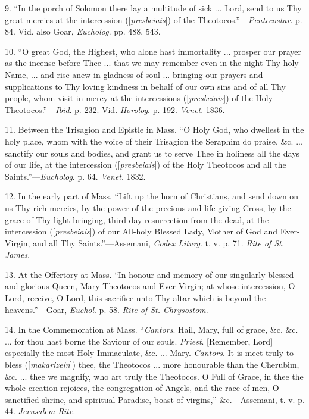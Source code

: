 9. ``In the porch of Solomon there lay a multitude of sick ...
Lord, send to us Thy great mercies at the intercession ([\emph{presbeiais}])
of the Theotocos.''—\emph{Pentecostar}. p. 84. Vid. also Goar, \emph{Eucholog}.
pp. 488, 543.


10. ``O great God, the Highest, who alone hast immortality ...
prosper our prayer as the incense before Thee ... that we may remember
even in the night Thy holy Name, ... and rise anew in gladness of soul
... bringing our prayers and supplications to Thy loving kindness in
behalf of our own sins and of all Thy people, whom visit in mercy at the
intercessions ([\emph{presbeiais}]) of the Holy Theotocos.''—\emph{Ibid}.
p. 232. Vid. \emph{Horolog}. p. 192. \emph{Venet}. 1836.


11. Between the Trisagion and Epistle in Mass. ``O Holy God, who
dwellest in the holy place, whom with the voice of their Trisagion the
Seraphim do praise, \&c. ... sanctify our souls and bodies, and grant
us to serve Thee in holiness all the days of our life, at the
intercession ([\emph{presbeiais}]) of the Holy Theotocos and all the
Saints.''—\emph{Eucholog}. p. 64. \emph{Venet}. 1832.


12. In the early part of Mass. ``Lift up the horn of Christians,
and send down on us Thy rich mercies, by the power of the precious and
life-giving Cross, by the grace of Thy light-bringing, third-day
resurrection from the dead, at the intercession ([\emph{presbeiais}]) of
our All-holy Blessed Lady, Mother of God and Ever-Virgin, and all Thy
Saints.''—Assemani, \emph{Codex Liturg}. t. v. p. 71. \emph{Rite of
St. James}.


13. At the Offertory at Mass. ``In honour and memory of our
singularly blessed and glorious Queen, Mary Theotocos and Ever-Virgin;
at whose intercession, O Lord, receive, O Lord, this sacrifice unto Thy
altar which is beyond the heavens.''—Goar, \emph{Euchol}. p. 58. \emph{Rite
of St. Chrysostom}.


14. In the Commemoration at Mass. ``\emph{Cantors}. Hail, Mary,
full of grace, \&c. \&c. ... for thou hast borne the Saviour of
our souls. \emph{Priest}. [Remember, Lord] especially the most Holy
Immaculate, \&c. ... Mary. \emph{Cantors}. It is meet truly to bless
([\emph{makarizein}]) thee, the Theotocos ... more honourable than the
Cherubim, \&c. ... thee we magnify, who art truly the Theotocos. O
Full of Grace, in thee the whole creation rejoices, the congregation of
Angels, and the race of men, O sanctified shrine, and spiritual
Paradise, boast of virgins,'' \&c.—Assemani, t. v. p. 44. \emph{Jerusalem
Rite}.


